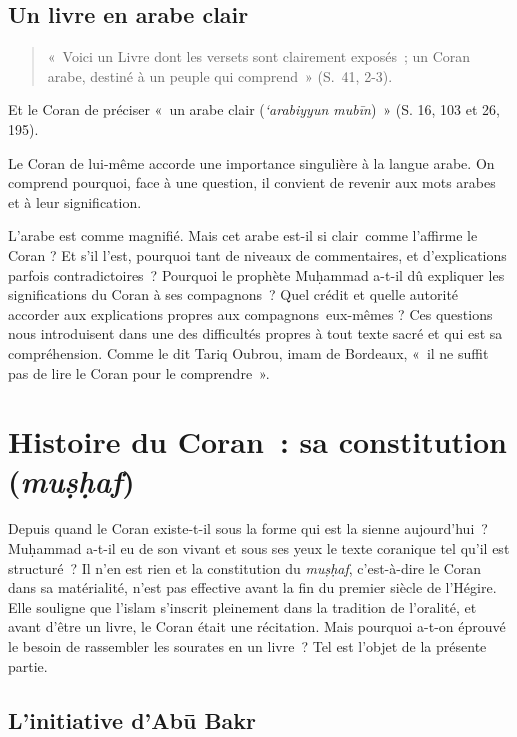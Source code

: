  
\subsection{ Un livre en arabe clair} 
\begin{quote}
    
«~Voici un Livre dont les versets sont clairement exposés~; un Coran
arabe, destiné à un peuple qui comprend~» (S.~41, 2-3).
\end{quote}

Et le Coran de préciser «~un arabe clair (\emph{`arabiyyun mubīn})~» (S.
16, 103 et 26, 195).

Le Coran de lui-même accorde une importance singulière à la langue
arabe. On comprend pourquoi, face à une question, il convient de revenir
aux mots arabes et à leur signification.

L'arabe est comme magnifié. Mais cet arabe est-il si clair~comme
l'affirme le Coran ? Et s'il l'est, pourquoi tant de niveaux de
commentaires, et d'explications parfois contradictoires~? Pourquoi le
prophète Muḥammad a-t-il dû expliquer les significations du Coran à ses
compagnons~? Quel crédit et quelle autorité accorder aux explications
propres aux compagnons~eux-mêmes ? Ces questions nous introduisent dans
une des difficultés propres à tout texte sacré et qui est sa
compréhension. Comme le dit Tariq Oubrou, imam de Bordeaux, «~il ne
suffit pas de lire le Coran pour le comprendre~».


\section{Histoire du Coran~: sa constitution
(\emph{muṣḥaf})}

Depuis quand le Coran existe-t-il sous la forme qui est la sienne
aujourd'hui~? Muḥammad a-t-il eu de son vivant et sous ses yeux le texte
coranique tel qu'il est structuré~? Il n'en est rien et la constitution
du \emph{muṣḥaf}, c'est-à-dire le Coran dans sa matérialité, n'est pas
effective avant la fin du premier siècle de l'Hégire. Elle souligne que
l'islam s'inscrit pleinement dans la tradition de l'oralité, et avant
d'être un livre, le Coran était une récitation. Mais pourquoi a-t-on
éprouvé le besoin de rassembler les sourates en un livre~? Tel est
l'objet de la présente partie.

 
\subsection{L'initiative d'Abū Bakr
} 


